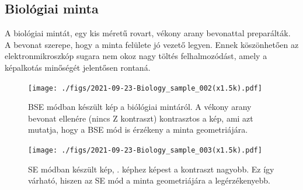 \documentclass[pdftex,12pt,a4paper]{article}
\begin{document}
	\subsection{Biológiai minta}
		A biológiai mintát, egy kis méretű rovart, vékony arany bevonattal preparálták. A bevonat szerepe, hogy a minta felülete jó vezető legyen. Ennek köszönhetően az elektronmikroszkóp sugara nem okoz nagy
		töltés felhalmozódást, amely a képalkotás minőségét jelentősen rontaná. 
		\begin{figure}[H]
			\centering
			\texttt{[image: ./figs/2021-09-23-Biology\_sample\_002(x1.5k).pdf]}
			\caption{BSE módban készült kép a biólógiai mintáról. A vékony arany bevonat ellenére (nincs Z kontraszt) kontrasztos a kép, ami azt mutatja, hogy a BSE mód is érzékeny a minta geometriájára.}
			\label{biology1}
		\end{figure}
		\begin{figure}[H]
			\centering
			\texttt{[image: ./figs/2021-09-23-Biology\_sample\_003(x1.5k).pdf]}
			\caption{SE módban készült kép, . képhez képest a kontraszt nagyobb. Ez így várható, hiszen az SE mód a minta geometriájára a legérzékenyebb.}
		\end{figure}
\end{document}
